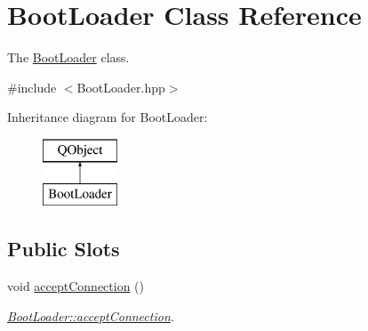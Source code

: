 \hypertarget{classBootLoader}{\section{Boot\+Loader Class Reference}
\label{classBootLoader}
}


The \hyperlink{classBootLoader}{Boot\+Loader} class.  




{\ttfamily \#include $<$Boot\+Loader.\+hpp$>$}

Inheritance diagram for Boot\+Loader\+:\begin{figure}[H]
\begin{center}
\leavevmode
\includegraphics[height=2.000000cm]{classBootLoader}
\end{center}
\end{figure}
\subsection*{Public Slots}
\begin{DoxyCompactItemize}
\item 
void \hyperlink{classBootLoader_a2c367b2058dd21fd7d691fb6ba9fa4af}{accept\+Connection} ()
\begin{DoxyCompactList}\small\item\em \hyperlink{classBootLoader_a2c367b2058dd21fd7d691fb6ba9fa4af}{Boot\+Loader\+::accept\+Connection}. \end{DoxyCompactList}\end{DoxyCompactItemize}
